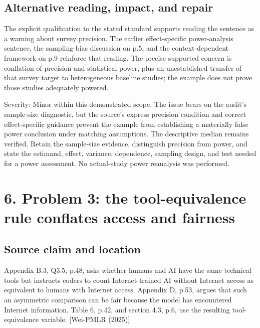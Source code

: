 \documentclass[10pt]{article}
\begin{document}
\subsection*{Alternative reading, impact, and repair}
The explicit qualification to the stated standard supports reading the sentence as a warning about survey precision. The earlier effect-specific power-analysis sentence, the sampling-bias discussion on p.5, and the context-dependent framework on p.9 reinforce that reading. The precise supported concern is conflation of precision and statistical power, plus an unestablished transfer of that survey target to heterogeneous baseline studies; the example does not prove those studies adequately powered.\par
Severity: Minor within this demonstrated scope. The issue bears on the audit’s sample-size diagnostic, but the source’s express precision condition and correct effect-specific guidance prevent the example from establishing a materially false power conclusion under matching assumptions. The descriptive median remains verified. Retain the sample-size evidence, distinguish precision from power, and state the estimand, effect, variance, dependence, sampling design, and test needed for a power assessment. No actual-study power reanalysis was performed.\par
\section*{6. Problem 3: the tool-equivalence rule conflates access and fairness}
\subsection*{Source claim and location}
Appendix B.3, Q3.5, p.48, asks whether humans and AI have the same technical tools but instructs coders to count Internet-trained AI without Internet access as equivalent to humans with Internet access. Appendix D, p.53, argues that such an asymmetric comparison can be fair because the model has encountered Internet information. Table 6, p.42, and section 4.3, p.6, use the resulting tool-equivalence variable. [Wei-PMLR (2025)]\par
\end{document}
